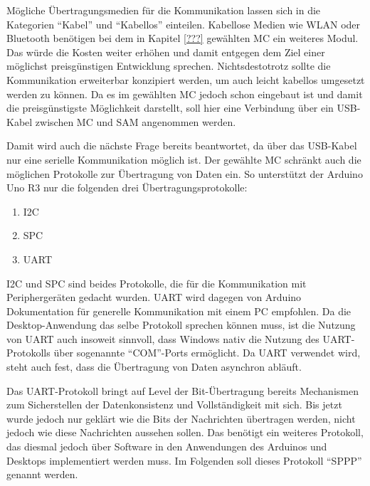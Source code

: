 Mögliche Übertragungsmedien für die Kommunikation lassen sich in die Kategorien \enquote{Kabel} und \enquote{Kabellos} einteilen.
Kabellose Medien wie WLAN oder Bluetooth benötigen bei dem in Kapitel \ref{???} gewählten \ac{MC} ein weiteres Modul.
Das würde die Kosten weiter erhöhen und damit entgegen dem Ziel einer möglichst preisgünstigen Entwicklung sprechen.
Nichtsdestotrotz sollte die Kommunikation erweiterbar konzipiert werden, um auch leicht kabellos umgesetzt werden zu können.
Da es im gewählten \ac{MC} jedoch schon eingebaut ist und damit die preisgünstigste Möglichkeit darstellt, soll hier eine Verbindung über ein USB-Kabel zwischen \ac{MC} und \ac{SAM} angenommen werden.

Damit wird auch die nächste Frage bereits beantwortet, da über das USB-Kabel nur eine serielle Kommunikation möglich ist.
Der gewählte \ac{MC} schränkt auch die möglichen Protokolle zur Übertragung von Daten ein.
So unterstützt der Arduino Uno R3 nur die folgenden drei Übertragungsprotokolle:
\begin{enumerate}
    \item \ac{I2C}
    \item \ac{SPC}
    \item \ac{UART}
\end{enumerate}
\ac{I2C} und \ac{SPC} sind beides Protokolle, die für die Kommunikation mit Periphergeräten gedacht wurden.
\ac{UART} wird dagegen von Arduino Dokumentation für generelle Kommunikation mit einem PC empfohlen. %
Da die Desktop-Anwendung das selbe Protokoll sprechen können muss, ist die Nutzung von \ac{UART} auch insoweit sinnvoll, dass Windows nativ die Nutzung des \ac{UART}-Protokolls über sogenannte \enquote{COM}-Ports ermöglicht.
Da \ac{UART} verwendet wird, steht auch fest, dass die Übertragung von Daten asynchron abläuft.

Das \ac{UART}-Protokoll bringt auf Level der Bit-Übertragung bereits Mechanismen zum Sicherstellen der Datenkonsistenz und Vollständigkeit mit sich. %
Bis jetzt wurde jedoch nur geklärt wie die Bits der Nachrichten übertragen werden, nicht jedoch wie diese Nachrichten aussehen sollen.
Das benötigt ein weiteres Protokoll, das diesmal jedoch über Software in den Anwendungen des Arduinos und Desktops implementiert werden muss.
Im Folgenden soll dieses Protokoll \enquote{\ac{SPPP}} genannt werden.

